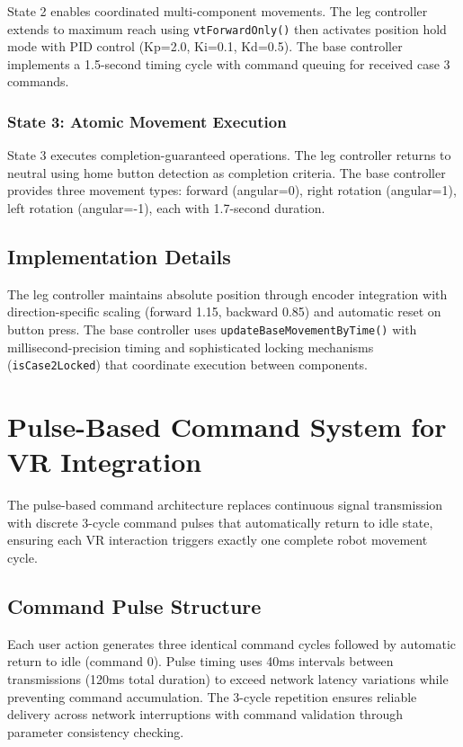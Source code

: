 State 2 enables coordinated multi-component movements. The leg controller extends to maximum reach using \texttt{vtForwardOnly()} then activates position hold mode with PID control (Kp=2.0, Ki=0.1, Kd=0.5). The base controller implements a 1.5-second timing cycle with command queuing for received case 3 commands.

\subsubsection{State 3: Atomic Movement Execution}

State 3 executes completion-guaranteed operations. The leg controller returns to neutral using home button detection as completion criteria. The base controller provides three movement types: forward (angular=0), right rotation (angular=1), left rotation (angular=-1), each with 1.7-second duration.

\subsection{Implementation Details}

The leg controller maintains absolute position through encoder integration with direction-specific scaling (forward 1.15, backward 0.85) and automatic reset on button press. The base controller uses \texttt{updateBaseMovementByTime()} with millisecond-precision timing and sophisticated locking mechanisms (\texttt{isCase2Locked}) that coordinate execution between components.

\section{Pulse-Based Command System for VR Integration}

The pulse-based command architecture replaces continuous signal transmission with discrete 3-cycle command pulses that automatically return to idle state, ensuring each VR interaction triggers exactly one complete robot movement cycle.

\subsection{Command Pulse Structure}

Each user action generates three identical command cycles followed by automatic return to idle (command 0). Pulse timing uses 40ms intervals between transmissions (120ms total duration) to exceed network latency variations while preventing command accumulation. The 3-cycle repetition ensures reliable delivery across network interruptions with command validation through parameter consistency checking.

